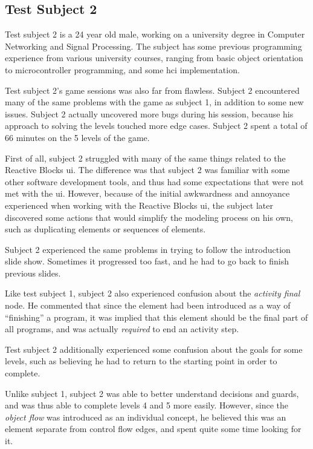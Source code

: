 \subsection{Test Subject 2}
\label{sec:game_testing_subject2}
Test subject 2 is a 24 year old male, working on a university degree in Computer Networking and Signal Processing. The subject has some previous programming experience from various university courses, ranging from basic object orientation to microcontroller programming, and some \gls{hci} implementation.

\noindent
Test subject 2's game sessions was also far from flawless. Subject 2 encountered many of the same problems with the game as subject 1, in addition to some new issues. Subject 2 actually uncovered more bugs during his session, because his approach to solving the levels touched more edge cases. Subject 2 spent a total of 66 minutes on the 5 levels of the game.

\noindent
First of all, subject 2 struggled with many of the same things related to the Reactive Blocks \gls{ui}. The difference was that subject 2 was familiar with some other software development tools, and thus had some expectations that were not met with the \gls{ui}. However, because of the initial awkwardness and annoyance experienced when working with the Reactive Blocks \gls{ui}, the subject later discovered some actions that would simplify the modeling process on his own, such as duplicating elements or sequences of elements.

\noindent
Subject 2 experienced the same problems in trying to follow the introduction slide show. Sometimes it progressed too fast, and he had to go back to finish previous slides.

\noindent
Like test subject 1, subject 2 also experienced confusion about the \emph{activity final} node. He commented that since the element had been introduced as a way of ``finishing'' a program, it was implied that this element should be the final part of all programs, and was actually \emph{required} to end an activity step.

\noindent
Test subject 2 additionally experienced some confusion about the goals for some levels, such as believing he had to return to the starting point in order to complete.

\noindent
Unlike subject 1, subject 2 was able to better understand decisions and guards, and was thus able to complete levels 4 and 5 more easily. However, since the \emph{object flow} was introduced as an individual concept, he believed this was an element separate from control flow edges, and spent quite some time looking for it.

